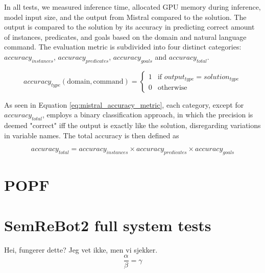 In all tests, we measured inference time, allocated GPU memory during inference, model input size, and the output from Mistral compared to the solution. The output is compared to the solution by its accuracy in predicting correct amount of instances, predicates, and goals based on the domain and natural language command. The evaluation metric is subdivided into four distinct categories: $accuracy_{instances}$, $accuracy_{predicates}$, $accuracy_{goals}$ and $accuracy_{total}$.

\begin{equation}\label{eq:mistral_accuracy_metric}
    accuracy_{type}(\text{domain}, \text{command})=
    \begin{cases}
        1 & \text{if } output_{type} = solution_{type} \\
        0 & \text{otherwise}
    \end{cases}
\end{equation}

As seen in Equation \ref{eq:mistral_accuracy_metric}, each category, except for $accuracy_{total}$, employs a binary classification approach, in which the precision is deemed "correct" iff the output is exactly like the solution, disregarding variations in variable names. The total accuracy is then defined as

\begin{equation}\label{eq:mistral_total_accuracy_metric}
    accuracy_{total}=accuracy_{instances}\times accuracy_{predicates}\times accuracy_{goals}
\end{equation}

\section{POPF}\label{sec:POPF_experiments}

\section{SemReBot2 full system tests}\label{sec:SemReBot2_experiments}
Hei, fungerer dette? Jeg vet ikke, men vi sjekker.
\begin{equation}
    \frac{\alpha}{\beta} = \gamma
\end{equation}